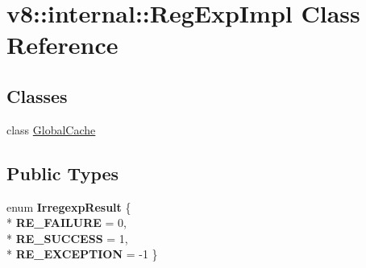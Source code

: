 \hypertarget{classv8_1_1internal_1_1_reg_exp_impl}{}\section{v8\+:\+:internal\+:\+:Reg\+Exp\+Impl Class Reference}
\label{classv8_1_1internal_1_1_reg_exp_impl}
\subsection*{Classes}
\begin{DoxyCompactItemize}
\item 
class \hyperlink{classv8_1_1internal_1_1_reg_exp_impl_1_1_global_cache}{Global\+Cache}
\end{DoxyCompactItemize}
\subsection*{Public Types}
\begin{DoxyCompactItemize}
\item 
enum {\bfseries Irregexp\+Result} \{ \\*
{\bfseries R\+E\+\_\+\+F\+A\+I\+L\+U\+RE} = 0, 
\\*
{\bfseries R\+E\+\_\+\+S\+U\+C\+C\+E\+SS} = 1, 
\\*
{\bfseries R\+E\+\_\+\+E\+X\+C\+E\+P\+T\+I\+ON} = -\/1
 \}\hypertarget{classv8_1_1internal_1_1_reg_exp_impl_a67a89cafc8ce13f1efbdc9147ce2542e}{}\label{classv8_1_1internal_1_1_reg_exp_impl_a67a89cafc8ce13f1efbdc9147ce2542e}

\end{DoxyCompactItemize}
